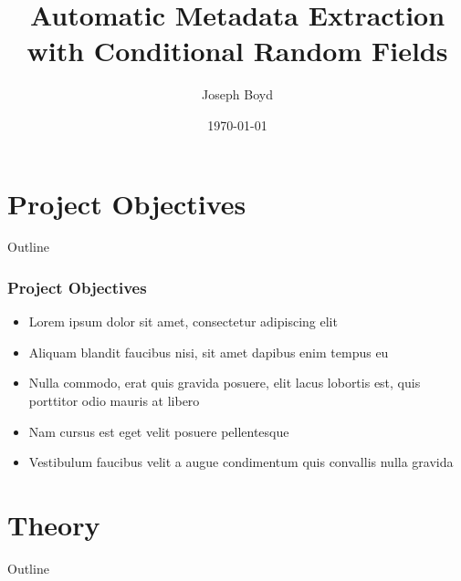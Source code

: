 \documentclass{beamer}
\title[Automatic Metadata Extraction]{Automatic Metadata Extraction with Conditional Random Fields} %
\author{Joseph Boyd} %
\institute[EPFL] %
{
\'Ecole Polytechnique F\'ed\'erale de Lausanne \\ %
\medskip
\textit{joseph.boyd@epfl.ch} %
}
\date{\today} %
\begin{document}
\begin{frame}
\titlepage %
\end{frame}


\section{Project Objectives}
\begin{frame}[noframenumbering]{Outline}
\tableofcontents[currentsection]
\end{frame}


\begin{frame}
\frametitle{Project Objectives}
\begin{itemize}
\item Lorem ipsum dolor sit amet, consectetur adipiscing elit
\item Aliquam blandit faucibus nisi, sit amet dapibus enim tempus eu
\item Nulla commodo, erat quis gravida posuere, elit lacus lobortis est, quis porttitor odio mauris at libero
\item Nam cursus est eget velit posuere pellentesque
\item Vestibulum faucibus velit a augue condimentum quis convallis nulla gravida
\end{itemize}
\end{frame}


\section{Theory}
\begin{frame}[noframenumbering]{Outline}
\tableofcontents[currentsection]
\end{frame}

\end{document}
